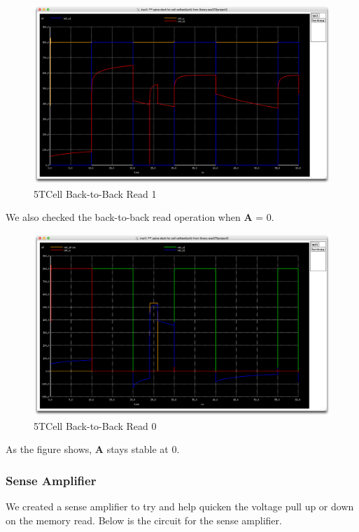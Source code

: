 \documentclass[a4paper]{article}
\begin{document}
 \begin{figure}[H]
	\centering
	\includegraphics[scale=0.12]{5TDoubleRead1}
	\caption{5TCell Back-to-Back Read 1}
	\label{fig:5TBackToBack1}
\end{figure}

We also checked the back-to-back read operation when \textbf{A} = 0.

 \begin{figure}[H]
	\centering
	\includegraphics[scale=0.12]{5TDoubleRead0}
	\caption{5TCell Back-to-Back Read 0}
	\label{fig:5TBackToBack0}
\end{figure}

As the figure shows, \textbf{A} stays stable at 0.

\subsubsection{Sense Amplifier}
\label{sec:sense_amplifier}
We created a sense amplifier to try and help quicken the voltage pull up or down on the memory read. Below is the circuit for the sense amplifier.
\end{document}
